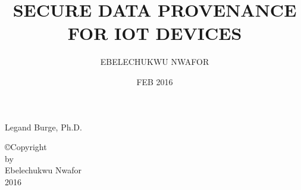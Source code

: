 \documentclass[12pt]{report}
\begin{document}

\setcounter{tocdepth}{2}


\title{SECURE DATA PROVENANCE FOR IOT DEVICES}

\author{EBELECHUKWU NWAFOR}
\date{FEB 2016}

                 {Legand Burge, Ph.D.}
                 
				


\makesigpage

\begin{CenteredPage}
\copyright Copyright\\[0.2in]
by\\[0.2in]
Ebelechukwu Nwafor\\[0.2in]
2016
\end{CenteredPage}

\maketitlepage
\end{document}
